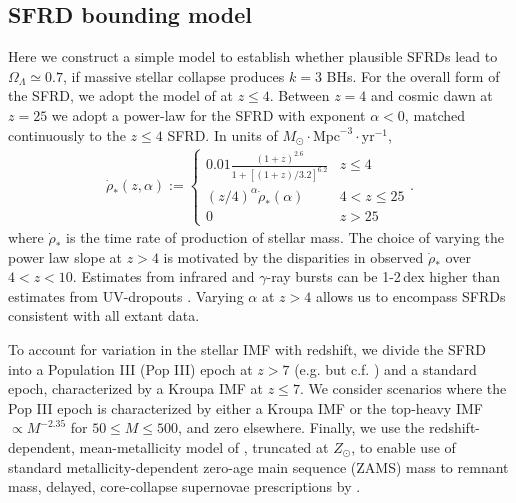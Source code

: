\documentclass[twocolumn,twocolappendix]{aastex631}
\begin{document}
\begin{appendix}

\section{SFRD bounding model}
  \label{sec:sfrd}
Here we construct a simple model to establish whether plausible SFRDs lead to $\Omega_{\Lambda}\simeq0.7$, if massive stellar collapse produces $k=3$ BHs.
For the overall form of the SFRD, we adopt the model of \citet{madaufragos2017} at $z\leqslant4$.
Between $z=4$ and cosmic dawn at $z=25$ we adopt a power-law for the SFRD with exponent $\alpha < 0$, matched continuously to the $z\leqslant4$ SFRD.
In units of $M_\odot\cdot\mathrm{Mpc}^{-3}\cdot\mathrm{yr}^{-1}$,
%
\begin{align}
  \dot{\rho}_*(z, \alpha) :=
  \begin{cases}
    0.01 \frac{(1+z)^{2.6}}{1 + \left[(1+z)/3.2\right]^{6.2}} & z \leqslant 4 \\
    (z/4)^\alpha \dot{\rho}_*(\alpha) & 4 < z \leqslant 25 \\
    0 & z > 25
  \end{cases} \label{eqn:sfr_model}.
\end{align}
where $\dot{\rho}_*$ is the time rate of production of stellar mass.
The choice of varying the power law slope at $z>4$ is motivated by the disparities in observed $\dot{\rho}_*$ over $4<z<10$.
Estimates from infrared \citep{mrr18} and $\gamma$-ray bursts \citep{kist09} can be 1-2\,dex higher than estimates from UV-dropouts \citep{donnandropouts2022, harikanedropouts2022, bouwens2022}.
Varying $\alpha$ at $z>4$ allows us to encompass SFRDs consistent with all extant data.

To account for variation in the stellar IMF with redshift, we divide the SFRD into a Population III (Pop III) epoch at $z > 7$ (e.g. \citet{inoue2014} but c.f. \citet{liu2020did}) and a standard epoch, characterized by a Kroupa IMF at $z \leqslant 7$.
We consider scenarios where the Pop III epoch is characterized by either a Kroupa IMF or the top-heavy \citet{harikanedropouts2022} IMF $\propto M^{-2.35}$ for $50 \leqslant M \leqslant 500$, and zero elsewhere.
Finally, we use the redshift-dependent, mean-metallicity model of \citet{madaufragos2017}, truncated at $Z_\odot$, to enable use of standard metallicity-dependent zero-age main sequence (ZAMS) mass to remnant mass, delayed, core-collapse supernovae prescriptions by \citet{fryerbelczynski2012}.


\end{appendix}
\end{document}
